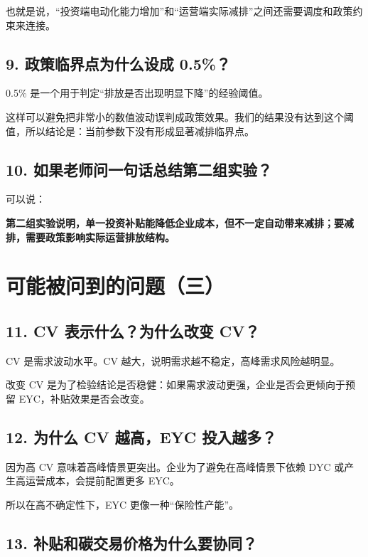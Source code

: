 \documentclass[UTF8,zihao=false,12pt]{ctexart}
\begin{document}
也就是说，“投资端电动化能力增加”和“运营端实际减排”之间还需要调度和政策约束来连接。

\subsection*{9. 政策临界点为什么设成 0.5\%？}

0.5\% 是一个用于判定“排放是否出现明显下降”的经验阈值。

这样可以避免把非常小的数值波动误判成政策效果。我们的结果没有达到这个阈值，所以结论是：当前参数下没有形成显著减排临界点。

\subsection*{10. 如果老师问一句话总结第二组实验？}

可以说：

\textbf{第二组实验说明，单一投资补贴能降低企业成本，但不一定自动带来减排；要减排，需要政策影响实际运营排放结构。}

\newpage

\section*{可能被问到的问题（三）}

\subsection*{11. CV 表示什么？为什么改变 CV？}

CV 是需求波动水平。CV 越大，说明需求越不稳定，高峰需求风险越明显。

改变 CV 是为了检验结论是否稳健：如果需求波动更强，企业是否会更倾向于预留 EYC，补贴效果是否会改变。

\subsection*{12. 为什么 CV 越高，EYC 投入越多？}

因为高 CV 意味着高峰情景更突出。企业为了避免在高峰情景下依赖 DYC 或产生高运营成本，会提前配置更多 EYC。

所以在高不确定性下，EYC 更像一种“保险性产能”。

\subsection*{13. 补贴和碳交易价格为什么要协同？}
\end{document}
